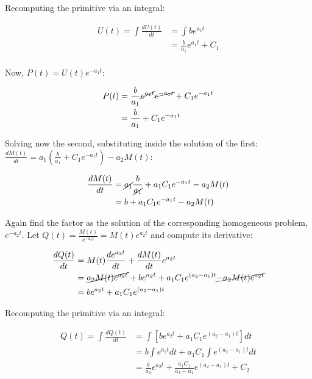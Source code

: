   Recomputing the primitive via an integral:

  \begin{align*}
    U(t) = \int\frac{dU(t)}{dt} &= \int be^{a_1t}\\
                                &= \frac{b}{a_1}e^{a_1t} +C_1 \\
  \end{align*}

  Now, $P(t) = U(t)e^{-a_1t}$:

  \begin{align*}
    P(t) &= \frac{b}{a_1}\cancel{e^{a_1t}}\cancel{e^{-a_1t}} + C_1e^{-a_1t}\\
         &= \frac{b}{a_1} + C_1e^{-a_1t}\\
  \end{align*}

  Solving now the second, substituting inside the solution of the first: $\frac{dM(t)}{dt} = a_1\left(\frac{b}{a_1} +C_1e^{-a_1t}\right) - a_2M(t)$:

  \begin{align*}
    \frac{dM(t)}{dt} &= \cancel{a_1}\frac{b}{\cancel{a_1}} +a_1C_1e^{-a_1t} - a_2M(t)\\
                     &= b + a_1C_1e^{-a_1t} - a_2M(t)\\
  \end{align*}

  Again find the factor as the solution of the corresponding homogeneous problem, $e^{-a_2t}$.
  Let $Q(t) = \frac{M(t)}{e^{-a_2t}} = M(t)e^{a_2t}$ and compute its derivative:

  \begin{align*}
    \frac{dQ(t)}{dt} &= M(t)\frac{de^{a_2t}}{dt} + \frac{dM(t)}{dt}e^{a_2t}\\
         &= \cancel{a_2M(t)e^{a_2t}} + be^{a_2t} + a_1C_1e^{(a_2-a_1)t} \cancel{-a_2M(t)e^{a_2t}}\\
         &= be^{a_2t} + a_1C_1e^{(a_2-a_1)t}
  \end{align*}

  Recomputing the primitive via an integral:

  \begin{align*}
    Q(t) = \int\frac{dQ(t)}{dt} &= \int\left[be^{a_2t} + a_1C_1e^{(a_2-a_1)t}\right]dt\\
                                &= b\int e^{a_2t}dt + a_1C_1\int e^{(a_2-a_1)t}dt\\
                                &=\frac{b}{a_2}e^{a_2t} + \frac{a_1C_1}{a_2-a_1}e^{(a_2-a_1)t} + C_2
  \end{align*}

